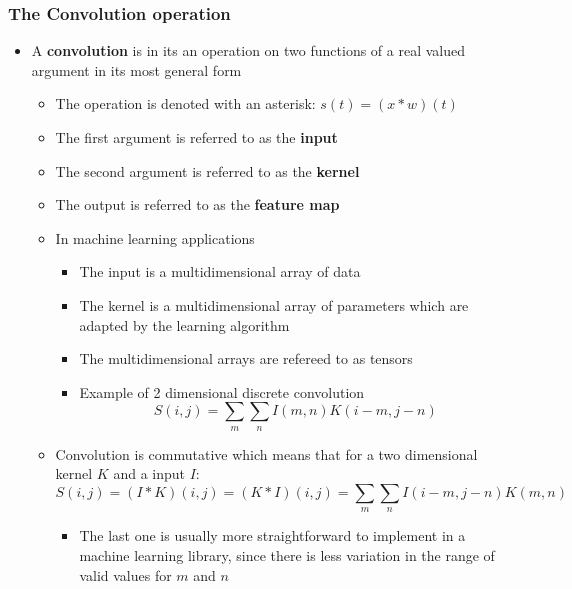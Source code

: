 \documentclass[a4, english]{article}
\begin{document}
\subsubsection{The Convolution operation}
\begin{itemize}
	\item A \textbf{convolution} is in its an operation on two functions of a real valued argument in its most general form
  \begin{itemize}
	  \item The operation is denoted with an asterisk: $s(t) = (x*w)(t)$
	  \item The first argument is referred to as the \textbf{input} 
  	\item The second argument is referred to as the \textbf{kernel} 
	  \item The output is referred to as the \textbf{feature map}
      \item In machine learning applications
    \begin{itemize}
    	\item The input is a multidimensional array of data
      \item The kernel is a multidimensional array of parameters which are adapted by the learning algorithm
      \item The multidimensional arrays are refereed to as tensors
      \item Example of 2 dimensional discrete convolution 
\begin{equation*}
  S(i,j) = \sum_m\sum_nI(m,n)K(i-m, j-n)
\end{equation*}

    \end{itemize}   
  	\item Convolution is commutative which means that for a two dimensional kernel $K$ and a input $I$: 
\begin{equation*}
  S(i,j) = (I*K)(i,j)=(K*I)(i,j)=\sum_m\sum_nI(i-m,j-n)K(m,n)
\end{equation*}
    \begin{itemize}
		  \item The last one is usually more straightforward to implement in a machine learning library, since there is less variation in the range of valid values for $m$ and $n$
    \end{itemize}
  \end{itemize}
\end{itemize}  
\end{document}
